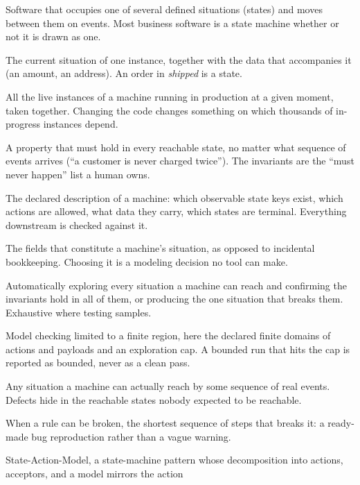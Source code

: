 \documentclass[11pt]{article}
\begin{document}
\begin{description}[leftmargin=0pt, style=nextline]
\item[State machine] Software that occupies one of several defined situations
  (states) and moves between them on events. Most business software is a state
  machine whether or not it is drawn as one.
\item[State] The current situation of one instance, together with the data that
  accompanies it (an amount, an address). An order in \emph{shipped} is a state.
\item[Fleet] All the live instances of a machine running in production at a
  given moment, taken together. Changing the code changes something on which
  thousands of in-progress instances depend.
\item[Invariant] A property that must hold in every reachable state, no matter
  what sequence of events arrives (``a customer is never charged twice''). The
  invariants are the ``must never happen'' list a human owns.
\item[Contract] The declared description of a machine: which observable state
  keys exist, which actions are allowed, what data they carry, which states are
  terminal. Everything downstream is checked against it.
\item[Observable state] The fields that constitute a machine's situation, as
  opposed to incidental bookkeeping. Choosing it is a modeling decision no tool
  can make.
\item[Model checking] Automatically exploring every situation a machine can
  reach and confirming the invariants hold in all of them, or producing the one
  situation that breaks them. Exhaustive where testing samples.
\item[Bounded model checking] Model checking limited to a finite region, here
  the declared finite domains of actions and payloads and an exploration cap. A
  bounded run that hits the cap is reported as bounded, never as a clean pass.
\item[Reachable state] Any situation a machine can actually reach by some
  sequence of real events. Defects hide in the reachable states nobody expected
  to be reachable.
\item[Counterexample] When a rule can be broken, the shortest sequence of steps
  that breaks it: a ready-made bug reproduction rather than a vague warning.
\item[SAM pattern] State-Action-Model, a state-machine pattern whose
  decomposition into actions, acceptors, and a model mirrors the action

\end{description}
\end{document}
